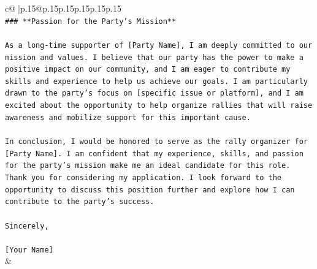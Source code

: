\documentclass{article}
\begin{document}
{\begin{supertabular}{c@{$\;$}|p{.15\linewidth}@{}p{.15\linewidth}p{.15\linewidth}p{.15\linewidth}p{.15\linewidth}p{.15\linewidth}}
{{{\\ 
\texttt{\#\#\# **Passion for the Party's Mission**} \\
\\ 
\texttt{As a long{-}time supporter of {[}Party Name{]}, I am deeply committed to our mission and values. I believe that our party has the power to make a positive impact on our community, and I am eager to contribute my skills and experience to help us achieve our goals. I am particularly drawn to the party's focus on {[}specific issue or platform{]}, and I am excited about the opportunity to help organize rallies that will raise awareness and mobilize support for this important cause.} \\
\\ 
\texttt{In conclusion, I would be honored to serve as the rally organizer for {[}Party Name{]}. I am confident that my experience, skills, and passion for the party's mission make me an ideal candidate for this role. Thank you for considering my application. I look forward to the opportunity to discuss this position further and explore how I can contribute to the party's success.} \\
\\ 
\texttt{Sincerely,} \\
\\ 
\texttt{{[}Your Name{]}} \\
            }
        }
    }
    & \\ \\


\end{supertabular}}
\end{document}
